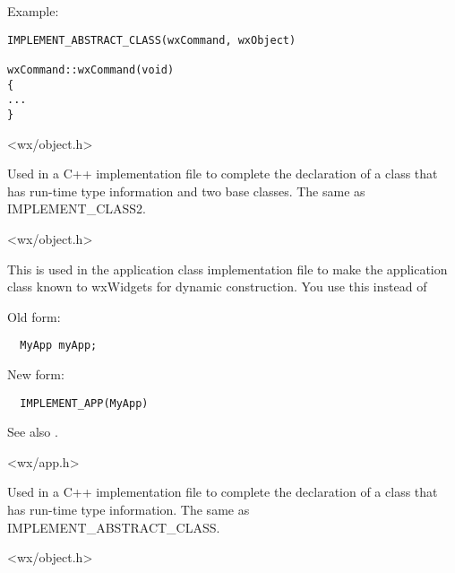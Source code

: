 Example:

\begin{verbatim}
IMPLEMENT_ABSTRACT_CLASS(wxCommand, wxObject)

wxCommand::wxCommand(void)
{
...
}
\end{verbatim}


<wx/object.h>


\label{implementabstractclass2}


Used in a C++ implementation file to complete the declaration of
a class that has run-time type information and two base classes. The same as IMPLEMENT\_CLASS2.


<wx/object.h>


\label{implementapp}


This is used in the application class implementation file to make the application class known to
wxWidgets for dynamic construction. You use this instead of

Old form:

\begin{verbatim}
  MyApp myApp;
\end{verbatim}

New form:

\begin{verbatim}
  IMPLEMENT_APP(MyApp)
\end{verbatim}

See also .


<wx/app.h>


\label{implementclass}


Used in a C++ implementation file to complete the declaration of
a class that has run-time type information. The same as IMPLEMENT\_ABSTRACT\_CLASS.


<wx/object.h>


\label{implementclass2}

